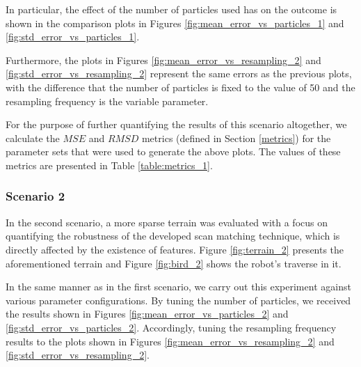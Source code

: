 In particular, the effect of the number of particles used has on
the outcome is shown in the comparison plots in Figures
\ref{fig:mean_error_vs_particles_1} and \ref{fig:std_error_vs_particles_1}.

Furthermore, the plots in Figures \ref{fig:mean_error_vs_resampling_2} and
\ref{fig:std_error_vs_resampling_2} represent the same errors as the previous
plots, with the difference that the number of particles is fixed to the
value of 50 and the resampling frequency is the variable parameter.

For the purpose of further quantifying the results of this scenario altogether,
we calculate the $MSE$ and $RMSD$ metrics (defined in Section \ref{metrics})
for the parameter sets that were used to generate the above plots.
The values of these metrics are presented in Table \ref{table:metrics_1}.


\subsubsection{Scenario 2}

In the second scenario, a more sparse terrain was evaluated with a focus on
quantifying the robustness of the developed scan matching technique, which
is directly affected by the existence of features.
Figure \ref{fig:terrain_2} presents the aforementioned terrain and
Figure \ref{fig:bird_2} shows the robot's traverse in it.

In the same manner as in the first scenario, we carry out this experiment
against various parameter configurations.
By tuning the number of particles, we received the results shown in Figures
\ref{fig:mean_error_vs_particles_2} and \ref{fig:std_error_vs_particles_2}.
Accordingly, tuning the resampling frequency results to the plots shown in
Figures \ref{fig:mean_error_vs_resampling_2} and
\ref{fig:std_error_vs_resampling_2}.

